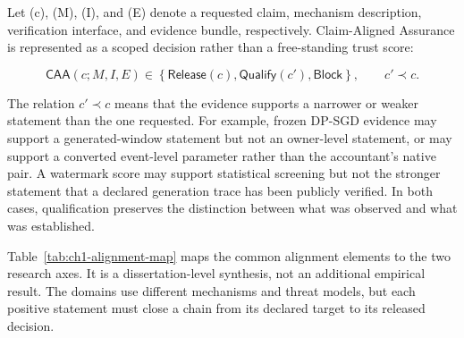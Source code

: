 Let (c), (M), (I), and (E) denote a requested claim, mechanism description,
verification interface, and evidence bundle, respectively.  Claim-Aligned
Assurance is represented as a scoped decision rather than a free-standing trust
score:

\begin{equation}
\mathsf{CAA}(c;M,I,E)
\in
\left\{
    \mathsf{Release}(c),
    \mathsf{Qualify}(c'),
    \mathsf{Block}
\right\},
\qquad c' \prec c.
\label{eq:ch1-caa-decision}
\end{equation}

The relation \(c'\prec c\) means that the evidence supports a narrower or weaker
statement than the one requested.  For example, frozen DP-SGD evidence may
support a generated-window statement but not an owner-level statement, or may
support a converted event-level parameter rather than the accountant's native
pair.  A watermark score may support statistical screening but not the stronger
statement that a declared generation trace has been publicly verified.  In both
cases, qualification preserves the distinction between what was observed and
what was established.

Table~\ref{tab:ch1-alignment-map} maps the common alignment elements to the two
research axes.  It is a dissertation-level synthesis, not an additional empirical
result.  The domains use different mechanisms and threat models, but each
positive statement must close a chain from its declared target to its released
decision.

